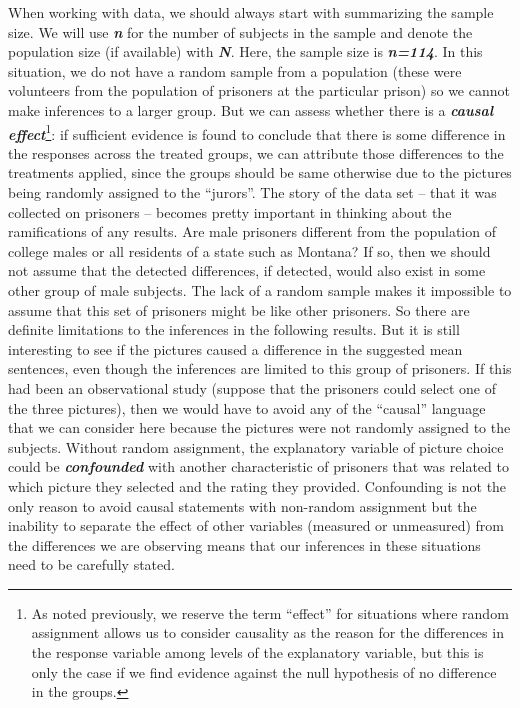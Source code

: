 \documentclass[]{book}
\let\rmarkdownfootnote\footnote%
\def\footnote{\protect\rmarkdownfootnote}
\theoremstyle{definition}
\theoremstyle{definition}
\theoremstyle{remark}
\begin{document}
When working with data, we should always start with summarizing the
sample size. We will use \textbf{\emph{n}} for the number of subjects in
the sample and denote the population size (if available) with
\textbf{\emph{N}}. Here, the sample size is \textbf{\emph{n=114}}. In
this situation, we do not have a random sample from a population (these
were volunteers from the population of prisoners at the particular
prison) so we cannot make inferences to a larger group. But we can
assess whether there is a \textbf{\emph{causal effect}}\footnote{As
  noted previously, we reserve the term ``effect'' for situations where
  random assignment allows us to consider causality as the reason for
  the differences in the response variable among levels of the
  explanatory variable, but this is only the case if we find evidence
  against the null hypothesis of no difference in the groups.}: if
sufficient evidence is found to conclude that there is some difference
in the responses across the treated groups, we can attribute those
differences to the treatments applied, since the groups should be same
otherwise due to the pictures being randomly assigned to the ``jurors''.
The story of the data set -- that it was collected on prisoners --
becomes pretty important in thinking about the ramifications of any
results. Are male prisoners different from the population of college
males or all residents of a state such as Montana? If so, then we should
not assume that the detected differences, if detected, would also exist
in some other group of male subjects. The lack of a random sample makes
it impossible to assume that this set of prisoners might be like other
prisoners. So there are definite limitations to the inferences in the
following results. But it is still interesting to see if the pictures
caused a difference in the suggested mean sentences, even though the
inferences are limited to this group of prisoners. If this had been an
observational study (suppose that the prisoners could select one of the
three pictures), then we would have to avoid any of the ``causal''
language that we can consider here because the pictures were not
randomly assigned to the subjects. Without random assignment, the
explanatory variable of picture choice could be
\textbf{\emph{confounded}} with another characteristic of prisoners that
was related to which picture they selected and the rating they provided.
Confounding is not the only reason to avoid causal statements with
non-random assignment but the inability to separate the effect of other
variables (measured or unmeasured) from the differences we are observing
means that our inferences in these situations need to be carefully
stated.
\end{document}
